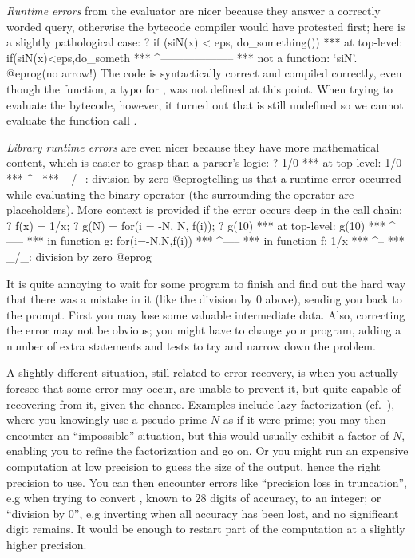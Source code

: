 \emph{Runtime errors} from the evaluator are nicer because they answer a
correctly worded query, otherwise the bytecode compiler would have protested
first; here is a slightly pathological case:
\bprog
? if (siN(x) < eps, do_something())
  ***   at top-level: if(siN(x)<eps,do_someth
  ***                    ^--------------------
  ***   not a function: `siN'.
@eprog\noindent (no arrow!) The code is syntactically correct and compiled
correctly, even though the  function, a typo for , was not
defined at this point. When trying to evaluate the bytecode, however, it
turned out that  is still undefined so we cannot evaluate the
function call .

\emph{Library runtime errors} are even nicer because they have more
mathematical content, which is easier to grasp than a parser's logic:
\bprog
? 1/0
  ***   at top-level: 1/0
  ***                  ^--
  *** _/_: division by zero
@eprog\noindent telling us that a runtime error occurred while evaluating the
binary \kbd{/} operator (the \kbd{\_} surrounding the operator are
placeholders). More context is provided if the error occurs deep in the
call chain:
\bprog
? f(x) = 1/x;
? g(N) = for(i = -N, N, f(i));
? g(10)
  ***   at top-level: g(10)
  ***                 ^-----
  ***   in function g: for(i=-N,N,f(i))
  ***                             ^-----
  ***   in function f: 1/x
  ***                   ^--
  *** _/_: division by zero
@eprog

\label{se:errorrec}

It is quite annoying to wait for some program to finish and find out the hard
way that there was a mistake in it (like the division by 0 above), sending
you back to the prompt. First you may lose some valuable intermediate data.
Also, correcting the error may not be obvious; you might have to change your
program, adding a number of extra statements and tests to try and narrow down
the problem.

A slightly different situation, still related to error recovery, is when you
actually foresee that some error may occur, are unable to prevent it, but
quite capable of recovering from it, given the chance. Examples include lazy
factorization (cf.~), where you knowingly use a pseudo prime
$N$ as if it were prime; you may then encounter an ``impossible'' situation,
but this would usually exhibit a factor of $N$, enabling you to refine the
factorization and go on. Or you might run an expensive computation at low
precision to guess the size of the output, hence the right precision to use.
You can then encounter errors like ``precision loss in truncation'', e.g when
trying to convert , known to $28$ digits of accuracy, to an
integer; or ``division by 0'', e.g inverting  when all accuracy
has been lost, and no significant digit remains. It would be enough to
restart part of the computation at a slightly higher precision.

